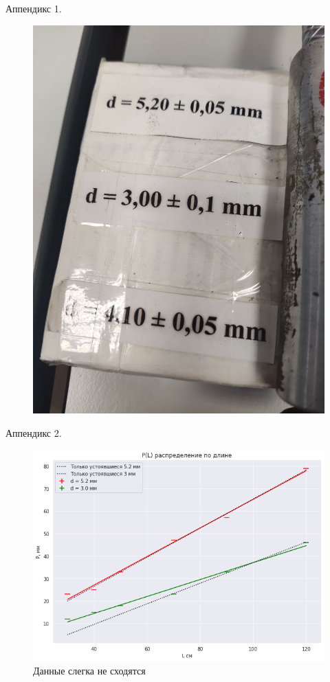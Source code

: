 \begin{frame}{Аппендикс 1.}
\begin{minipage}{.5\textwidth}
\begin{figure}
    \includegraphics[scale=0.12]{Images_viscosty/lengths.jpg}
\end{figure}
\end{minipage}%
\end{frame}



\begin{frame}{Аппендикс 2.}
\begin{figure}
    \includegraphics[scale=0.40]{Images_viscosty/asAlways.png}
    \caption{Данные слегка не сходятся}
    \label{fig:my_label}
\end{figure}
\end{frame}